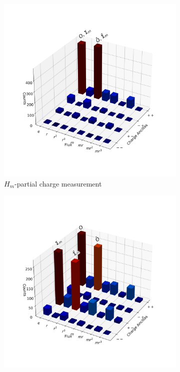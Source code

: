 \documentclass[a4paper,twocolumn,11pt]{quantumarticle}
\begin{document}
\begin{figure}
    \centering
    \begin{subfigure}{0.49\linewidth}
        \centering
        \includegraphics[width=\linewidth]{Figures/glasses_m.png}
        \caption{$H_m$-partial charge measurement}
        \label{fig:glasses_Hm}
    \end{subfigure}
    \begin{subfigure}{0.49\linewidth}
        \centering
        \includegraphics[width=\linewidth]{Figures/glasses_mr.png}

\end{subfigure}
\end{figure}
\end{document}
